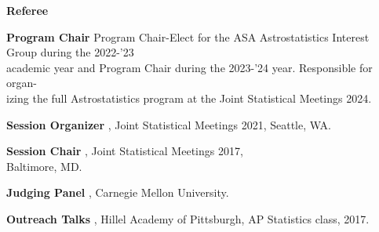 \documentclass[letterpaper,10pt]{article}
\begin{document}
\begin{addmargin}[0.25cm]{2ex}

{\bf Referee}
\hspace{13.5ex}{\it Astronomy and Computing (A\&C)} 

\vspace{0.15cm}

\hspace{23ex}{\it Journal of Cosmology and Astroparticle Physics (JCAP)} 

\vspace{0.15cm}

\hspace{23ex}{\it NASA Experimental Program to Stimulate Competitive Research (EPSCoR)} 

\vspace{0.15cm}

\hspace{23ex}{\it CHANCE Magazine}


\vspace{.4cm}


{\bf Program Chair}
\indent\hspace{4.9ex}Program Chair-Elect for the ASA Astrostatistics Interest Group during the 2022-'23\\
\indent\hspace{23ex}academic year and Program Chair during the 2023-'24 year. Responsible for organ-\\
\indent\hspace{23ex}izing the full Astrostatistics program at the Joint Statistical Meetings 2024.

\vspace{.4cm}

{\bf Session Organizer}
\indent\hspace{1.35ex}{\it Statistical Challenges in Cosmology}, Joint Statistical Meetings 2021, Seattle, WA.

\vspace{.4cm}

{\bf Session Chair}
\indent\hspace{6.1ex}{\it Computing, Graphics, and Programming Statistics}, Joint Statistical Meetings 2017,\\
\indent\hspace{23ex}Baltimore, MD.

\vspace{.4cm}

{\bf Judging Panel}
\hspace{5.35ex}{\it Tartan Data Science Cup 2017}, Carnegie Mellon University. 

\vspace{.4cm}

{\bf Outreach Talks}
\hspace{4.35ex}{\it Astrostatistics}, Hillel Academy of Pittsburgh, AP Statistics class, 2017.

\end{addmargin}
\end{document}
